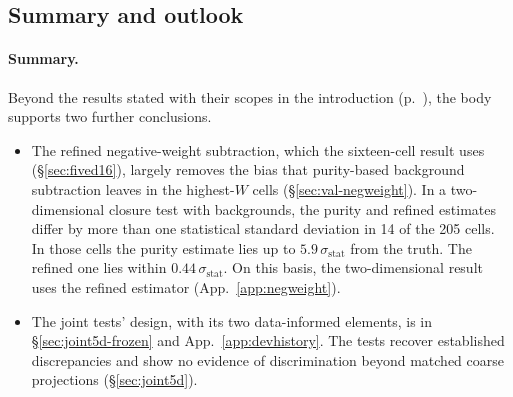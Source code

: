 \subsection{Summary and outlook}
\label{sec:summary}

\paragraph{Summary.} Beyond the results stated with their scopes in the introduction (p.~\pageref{sec:intro}), the body supports two further conclusions.
\begin{itemize}[itemsep=2pt]
  \item The refined negative-weight subtraction, which the sixteen-cell result uses (\S\ref{sec:fived16}), largely removes the bias that purity-based background subtraction leaves in the highest-$W$ cells (\S\ref{sec:val-negweight}). In a two-dimensional closure test with backgrounds, the purity and refined estimates differ by more than one statistical standard deviation in 14 of the 205 cells. In those cells the purity estimate lies up to $5.9\,\sigma_{\mathrm{stat}}$ from the truth. The refined one lies within $0.44\,\sigma_{\mathrm{stat}}$. On this basis, the two-dimensional result uses the refined estimator (App.~\ref{app:negweight}).
  \item The joint tests' design, with its two data-informed elements, is in \S\ref{sec:joint5d-frozen} and App.~\ref{app:devhistory}. The tests recover established discrepancies and show no evidence of discrimination beyond matched coarse projections (\S\ref{sec:joint5d}).
\end{itemize}

